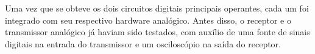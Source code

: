 	Uma vez que se obteve os dois circuitos digitais principais operantes, cada um foi integrado com seu respectivo hardware analógico. Antes disso, o receptor e o transmissor analógico já haviam sido testados, com auxílio de uma fonte de sinais digitais na entrada do transmissor e um osciloscópio na saída do receptor.
